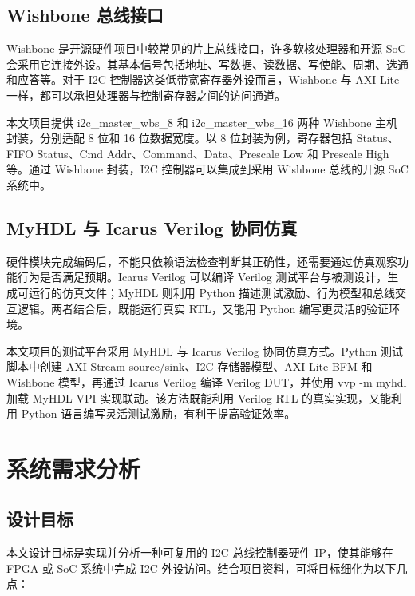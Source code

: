 \documentclass[12pt,a4paper]{article}
\numberwithin{equation}{section}
\begin{document}
\subsection{Wishbone
总线接口}\label{wishbone-ux603bux7ebfux63a5ux53e3}

Wishbone 是开源硬件项目中较常见的片上总线接口，许多软核处理器和开源 SoC
会采用它连接外设。其基本信号包括地址、写数据、读数据、写使能、周期、选通和应答等。对于
I2C 控制器这类低带宽寄存器外设而言，Wishbone 与 AXI Lite
一样，都可以承担处理器与控制寄存器之间的访问通道。

本文项目提供 i2c\_master\_wbs\_8 和
i2c\_master\_wbs\_16 两种 Wishbone
主机封装，分别适配 8 位和 16 位数据宽度。以 8 位封装为例，寄存器包括
Status、FIFO Status、Cmd Addr、Command、Data、Prescale Low 和 Prescale
High 等。通过 Wishbone 封装，I2C 控制器可以集成到采用 Wishbone
总线的开源 SoC 系统中。

\subsection{MyHDL 与 Icarus Verilog
协同仿真}\label{myhdl-ux4e0e-icarus-verilog-ux534fux540cux4effux771f}

硬件模块完成编码后，不能只依赖语法检查判断其正确性，还需要通过仿真观察功能行为是否满足预期。Icarus
Verilog 可以编译 Verilog 测试平台与被测设计，生成可运行的仿真文件；MyHDL
则利用 Python
描述测试激励、行为模型和总线交互逻辑。两者结合后，既能运行真实
RTL，又能用 Python 编写更灵活的验证环境。

本文项目的测试平台采用 MyHDL 与 Icarus Verilog 协同仿真方式。Python
测试脚本中创建 AXI Stream source/sink、I2C 存储器模型、AXI Lite BFM 和
Wishbone 模型，再通过 Icarus Verilog 编译 Verilog DUT，并使用
vvp -m myhdl 加载 MyHDL VPI
实现联动。该方法既能利用 Verilog RTL 的真实实现，又能利用 Python
语言编写灵活测试激励，有利于提高验证效率。

\section{系统需求分析}\label{ux7cfbux7edfux9700ux6c42ux5206ux6790}

\subsection{设计目标}\label{ux8bbeux8ba1ux76eeux6807}

本文设计目标是实现并分析一种可复用的 I2C 总线控制器硬件 IP，使其能够在
FPGA 或 SoC 系统中完成 I2C
外设访问。结合项目资料，可将目标细化为以下几点：
\end{document}
